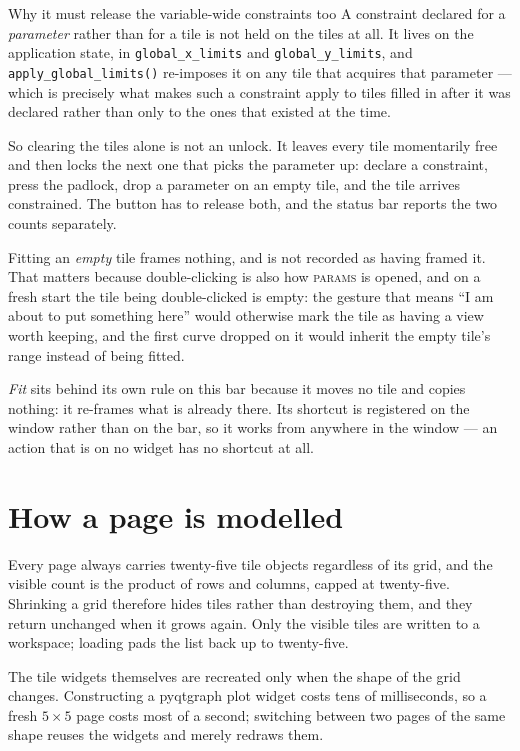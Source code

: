 \documentclass[11pt,a4paper,oneside]{report}
\newcommand{\code}[1]{\texttt{#1}}
\newcommand{\tab}[1]{\textsc{#1}}
\begin{document}
\begin{aoenote}{Why it must release the variable-wide constraints too}
A constraint declared for a \emph{parameter} rather than for a tile is not held
on the tiles at all. It lives on the application state, in
\code{global\_x\_limits} and \code{global\_y\_limits}, and
\code{apply\_global\_limits()} re-imposes it on any tile that acquires that
parameter --- which is precisely what makes such a constraint apply to tiles
filled in after it was declared rather than only to the ones that existed at the
time.

So clearing the tiles alone is not an unlock. It leaves every tile momentarily
free and then locks the next one that picks the parameter up: declare a
constraint, press the padlock, drop a parameter on an empty tile, and the tile
arrives constrained. The button has to release both, and the status bar reports
the two counts separately.
\end{aoenote}

Fitting an \emph{empty} tile frames nothing, and is not recorded as having
framed it. That matters because double-clicking is also how \tab{params} is
opened, and on a fresh start the tile being double-clicked is empty: the
gesture that means ``I am about to put something here'' would otherwise mark
the tile as having a view worth keeping, and the first curve dropped on it
would inherit the empty tile's range instead of being fitted.

\emph{Fit} sits behind its own rule on this bar because it moves no tile and
copies nothing: it re-frames what is already there. Its shortcut is registered
on the window rather than on the bar, so it works from anywhere in the window
--- an action that is on no widget has no shortcut at all.

\section{How a page is modelled}

Every page always carries twenty-five tile objects regardless of its grid, and
the visible count is the product of rows and columns, capped at twenty-five.
Shrinking a grid therefore hides tiles rather than destroying them, and they
return unchanged when it grows again. Only the visible tiles are written to a
workspace; loading pads the list back up to twenty-five.

The tile widgets themselves are recreated only when the shape of the grid
changes. Constructing a pyqtgraph plot widget costs tens of milliseconds, so a
fresh $5 \times 5$ page costs most of a second; switching between two pages of
the same shape reuses the widgets and merely redraws them.
\end{document}

